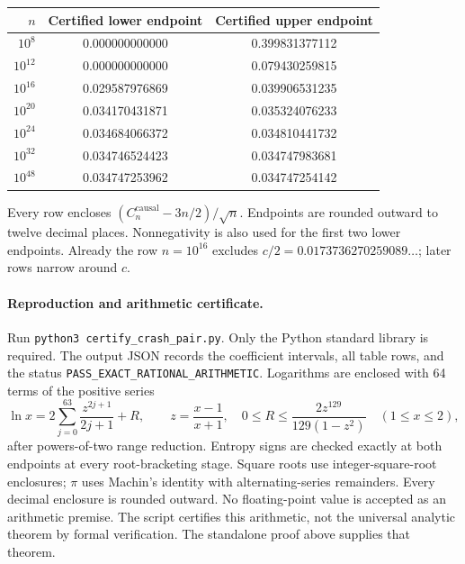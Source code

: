 \documentclass[11pt,a4paper]{article}
\newcommand{\causal}{\mathrm{causal}}
\begin{document}
\begin{center}
\begin{tabular}{@{}rcc@{}}
\toprule
$n$ & Certified lower endpoint & Certified upper endpoint\\
\midrule
$10^{8}$ & 0.000000000000 & 0.399831377112 \\
$10^{12}$ & 0.000000000000 & 0.079430259815 \\
$10^{16}$ & 0.029587976869 & 0.039906531235 \\
$10^{20}$ & 0.034170431871 & 0.035324076233 \\
$10^{24}$ & 0.034684066372 & 0.034810441732 \\
$10^{32}$ & 0.034746524423 & 0.034747983681 \\
$10^{48}$ & 0.034747253962 & 0.034747254142 \\
\bottomrule
\end{tabular}
\end{center}
Every row encloses $(C_n^{\causal}-3n/2)/\sqrt n$. Endpoints are rounded
outward to twelve decimal places. Nonnegativity is also used for the
first two lower endpoints. Already the row $n=10^{16}$ excludes
$c/2=0.0173736270259089\ldots$; later rows narrow around $c$.

\paragraph{Reproduction and arithmetic certificate.}
Run \texttt{python3 certify\_crash\_pair.py}. Only the Python standard
library is required. The output JSON records the coefficient intervals,
all table rows, and the status \texttt{PASS\_EXACT\_RATIONAL\_ARITHMETIC}.
Logarithms are enclosed with 64 terms of the positive series
\[
\ln x=2\sum_{j=0}^{63}\frac{z^{2j+1}}{2j+1}+R,
\qquad z=\frac{x-1}{x+1},\quad
0\le R\le\frac{2z^{129}}{129(1-z^2)}\quad(1\le x\le2),
\]
after powers-of-two range reduction. Entropy signs are checked exactly
at both endpoints at every root-bracketing stage. Square roots use
integer-square-root enclosures; $\pi$ uses Machin's identity with
alternating-series remainders. Every decimal enclosure is rounded
outward. No floating-point value is accepted as an arithmetic premise.
The script certifies this arithmetic, not the universal analytic theorem
by formal verification. The standalone proof above supplies that theorem.
\end{document}
